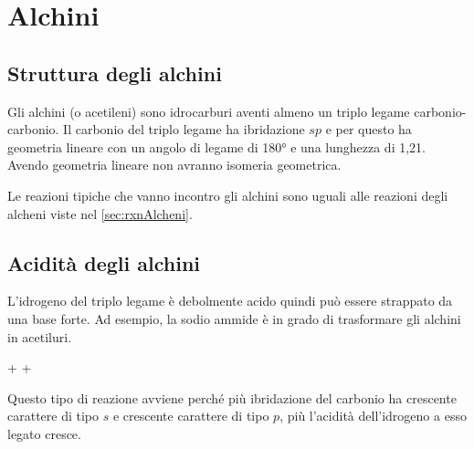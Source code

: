 \chapter{Alchini}\label{chp:Alchini}

\section{Struttura degli alchini}
Gli alchini (o acetileni) sono idrocarburi aventi almeno un triplo legame carbonio-carbonio. Il carbonio del triplo legame ha ibridazione \(sp\) e per questo ha geometria lineare con un angolo di legame di \ang{180} e una lunghezza di 1,21\angstrom. Avendo geometria lineare non avranno isomeria geometrica.

Le reazioni tipiche che vanno incontro gli alchini sono uguali alle reazioni degli alcheni viste nel \autoref{sec:rxnAlcheni}.

\section{Acidità degli alchini}
L'idrogeno del triplo legame è debolmente acido quindi può essere strappato da una base forte. Ad esempio, la sodio ammide è in grado di trasformare gli alchini in acetiluri.

\begin{reaction}
	 +    + 
\end{reaction}

Questo tipo di reazione avviene perché più ibridazione del carbonio ha crescente carattere di tipo \(s\) e crescente carattere di tipo \(p\), più l'acidità dell'idrogeno a esso legato cresce.